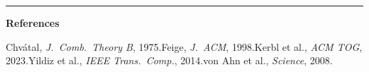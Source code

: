 \documentclass[9pt,letterpaper,twocolumn]{extarticle}
\begin{document}
\vspace{6pt}
\noindent\textcolor{ac}{\rule{\columnwidth}{0.3pt}}

\vspace{2pt}
{\scriptsize\textbf{References}\par\vspace{1pt}
\noindent [1] Chv\'{a}tal, \textit{J.\ Comb.\ Theory B}, 1975.\;
[2] Feige, \textit{J.\ ACM}, 1998.\;
[3] Kerbl et al., \textit{ACM TOG}, 2023.\;
[4] Yildiz et al., \textit{IEEE Trans.\ Comp.}, 2014.\;
[5] von Ahn et al., \textit{Science}, 2008.\par}
\end{document}
